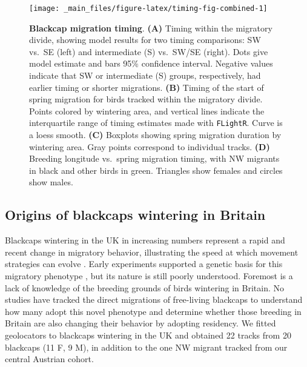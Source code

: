 \documentclass[a4paper, twoside]{templates/ociamthesis}
\begin{document}
\begin{figure}
\texttt{[image: \_main\_files/figure-latex/timing-fig-combined-1]} \caption{\textbf{Blackcap migration timing}. \textbf{(A)} Timing within the migratory divide, showing model results for two timing comparisons: SW vs.~SE (left) and intermediate (S) vs.~SW/SE (right). Dots give model estimate and bars 95\% confidence interval. Negative values indicate that SW or intermediate (S) groups, respectively, had earlier timing or shorter migrations. \textbf{(B)} Timing of the start of spring migration for birds tracked within the migratory divide. Points colored by wintering area, and vertical lines indicate the interquartile range of timing estimates made with \texttt{FLightR}. Curve is a loess smooth. \textbf{(C)} Boxplots showing spring migration duration by wintering area. Gray points correspond to individual tracks. \textbf{(D)} Breeding longitude vs.~spring migration timing, with NW migrants in black and other birds in green. Triangles show females and circles show males.}\label{fig:timing-fig-combined}
\end{figure}

\hypertarget{origins-of-blackcaps-wintering-in-britain}{%
\subsection{Origins of blackcaps wintering in Britain}\label{origins-of-blackcaps-wintering-in-britain}}

Blackcaps wintering in the UK in increasing numbers represent a rapid and recent change in migratory behavior, illustrating the speed at which movement strategies can evolve \autocite{bertholdMigratoryBehaviourPopulation1988,leachWinteringBlackcapsBritain1981}.
Early experiments supported a genetic basis for this migratory phenotype \autocite{bertholdRapidMicroevolutionMigratory1992}, but its nature is still poorly understood.
Foremost is a lack of knowledge of the breeding grounds of birds wintering in Britain.
No studies have tracked the direct migrations of free-living blackcaps to understand how many adopt this novel phenotype and determine whether those breeding in Britain are also changing their behavior by adopting residency.
We fitted geolocators to blackcaps wintering in the UK and obtained 22 tracks from 20 blackcaps (11 F, 9 M), in addition to the one NW migrant tracked from our central Austrian cohort.
\end{document}

